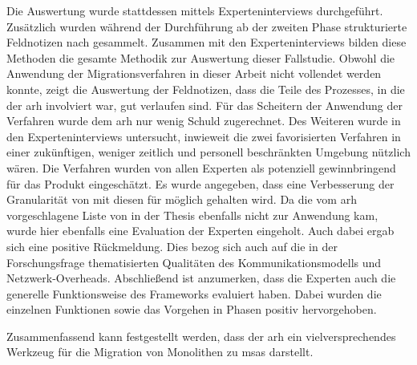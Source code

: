 Die Auswertung wurde stattdessen mittels Experteninterviews durchgeführt. 
Zusätzlich wurden während der Durchführung ab der zweiten Phase strukturierte Feldnotizen nach  gesammelt.
Zusammen mit den Experteninterviews bilden diese Methoden die gesamte Methodik zur Auswertung dieser Fallstudie.
Obwohl die Anwendung der Migrationsverfahren in dieser Arbeit nicht vollendet werden konnte, zeigt die Auswertung der Feldnotizen, dass die Teile des Prozesses, in die der \gls{arh} involviert war, gut verlaufen sind.
Für das Scheitern der Anwendung der Verfahren wurde dem \gls{arh} nur wenig Schuld zugerechnet.
Des Weiteren wurde in den Experteninterviews untersucht, inwieweit die zwei favorisierten Verfahren in einer zukünftigen, weniger zeitlich und personell beschränkten Umgebung nützlich wären.
Die Verfahren wurden von allen Experten als potenziell gewinnbringend für das Produkt eingeschätzt. 
Es wurde angegeben, dass eine Verbesserung der Granularität von \jf mit diesen für möglich gehalten wird.
Da die vom \gls{arh} vorgeschlagene Liste von \bpp in der Thesis ebenfalls nicht zur Anwendung kam, wurde hier ebenfalls eine Evaluation der Experten eingeholt.
Auch dabei ergab sich eine positive Rückmeldung.
Dies bezog sich auch auf die in der Forschungsfrage thematisierten Qualitäten des Kommunikationsmodells und Netzwerk-Overheads.
Abschließend ist anzumerken, dass die Experten auch die generelle Funktionsweise des Frameworks evaluiert haben. 
Dabei wurden die einzelnen Funktionen sowie das Vorgehen in Phasen positiv hervorgehoben.
%

Zusammenfassend kann festgestellt werden, dass der \gls{arh} ein vielversprechendes Werkzeug für die Migration von Monolithen zu \glspl{msa} darstellt.

